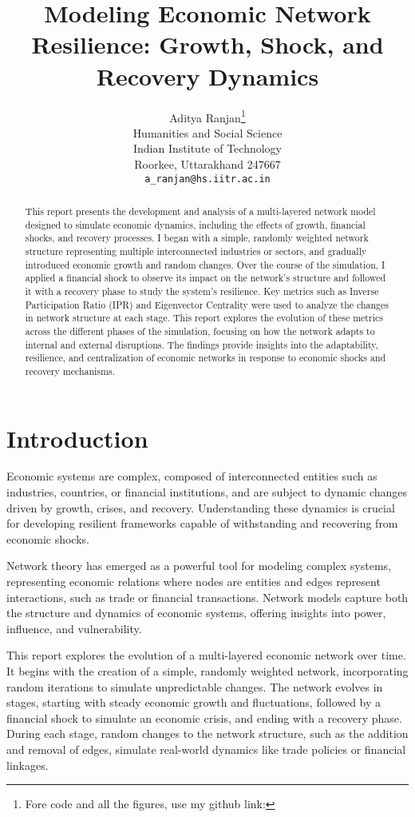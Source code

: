 \documentclass{article} %
\title{Modeling Economic Network Resilience: Growth, Shock, and Recovery Dynamics}
\author{
Aditya Ranjan\thanks{ Fore code and all the figures, use my github link: } \\
Humanities and Social Science\\
Indian Institute of Technology\\
Roorkee, Uttarakhand 247667 \\
\texttt{a\_ranjan@hs.iitr.ac.in}
}
\begin{document}
\maketitle

\begin{abstract}
This report presents the development and analysis of a multi-layered network model designed to simulate economic dynamics, including the effects of growth, financial shocks, and recovery processes. I began with a simple, randomly weighted network structure representing multiple interconnected industries or sectors, and gradually introduced economic growth and random changes. Over the course of the simulation, I applied a financial shock to observe its impact on the network's structure and followed it with a recovery phase to study the system's resilience. Key metrics such as Inverse Participation Ratio (IPR) and Eigenvector Centrality were used to analyze the changes in network structure at each stage. This report explores the evolution of these metrics across the different phases of the simulation, focusing on how the network adapts to internal and external disruptions. The findings provide insights into the adaptability, resilience, and centralization of economic networks in response to economic shocks and recovery mechanisms.
\end{abstract}

\section{Introduction}
Economic systems are complex, composed of interconnected entities such as industries, countries, or financial institutions, and are subject to dynamic changes driven by growth, crises, and recovery. Understanding these dynamics is crucial for developing resilient frameworks capable of withstanding and recovering from economic shocks.

Network theory has emerged as a powerful tool for modeling complex systems, representing economic relations where nodes are entities and edges represent interactions, such as trade or financial transactions. Network models capture both the structure and dynamics of economic systems, offering insights into power, influence, and vulnerability.

This report explores the evolution of a multi-layered economic network over time. It begins with the creation of a simple, randomly weighted network, incorporating random iterations to simulate unpredictable changes. The network evolves in stages, starting with steady economic growth and fluctuations, followed by a financial shock to simulate an economic crisis, and ending with a recovery phase. During each stage, random changes to the network structure, such as the addition and removal of edges, simulate real-world dynamics like trade policies or financial linkages.
\end{document}
